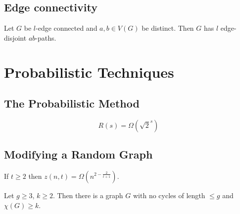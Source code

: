 \documentclass{article}
\begin{document}
\subsection{Edge connectivity}

\begin{ncor}\label{cor:36}
    Let $G$ be $l$-edge connected and $a,b \in V(G)$ be distinct.
    Then $G$ has $l$ edge-disjoint $ab$-paths.
\end{ncor}

\clearpage
\section{Probabilistic Techniques}
\subsection{The Probabilistic Method}







\begin{nthm}[Erd\H{o}s]\label{thm:37}
    \begin{equation*}
        R(s) = \Omega(\sqrt{2}^s)
    \end{equation*}
\end{nthm}

\subsection{Modifying a Random Graph}













\begin{nthm}\label{thm:38}
    If $t \geq 2$ then $z(n,t) = \Omega(n^{2 - \frac{2}{t+1}})$.
\end{nthm}




\begin{nthm}\label{thm:39}
    Let $g \geq 3$, $k \geq 2$. Then there is a graph $G$ with no cycles of length $\leq g$ and $\chi(G) \geq k$.
\end{nthm}


{
}
\end{document}
